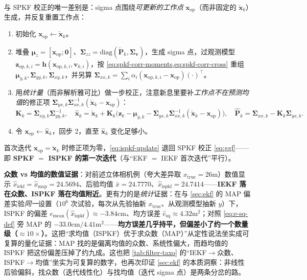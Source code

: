 \begin{algo}\label{algo:ispkf}
与 SPKF 校正的唯一差别是：sigma 点围绕\emph{可更新的工作点} $\mathbf{x}_{\text{op}}$（而非固定的 $\check{\mathbf{x}}_k$）生成，并反复重置工作点\cite{barfoot2024state}：
\begin{enumerate}
  \item 初始化 $\mathbf{x}_{\text{op}}\leftarrow\check{\mathbf{x}}_k$。
  \item 堆叠 $\boldsymbol{\mu}_z=[\mathbf{x}_{\text{op}};\mathbf{0}]$、$\boldsymbol{\Sigma}_{zz}=\mathrm{diag}(\check{\mathbf{P}}_k,\boldsymbol{\Sigma}_{\mathbf{v}})$，生成 sigma 点，过观测模型 $\mathbf{z}_{\text{op},k,i}=\mathbf{h}(\mathbf{x}_{\text{op},k,i},\mathbf{v}_{k,i})$，按 \cref{eq:spkf-corr-moments,eq:spkf-corr-cross} 重组 $\boldsymbol{\mu}_{y,k},\boldsymbol{\Sigma}_{yy,k},\boldsymbol{\Sigma}_{xy,k}$，并另算 $\boldsymbol{\Sigma}_{xx,k}=\sum_i\alpha_i(\mathbf{x}_{\text{op},k,i}-\mathbf{x}_{\text{op}})(\cdot)^\top$。
  \item 用\emph{统计量}（而非解析雅可比）做一步校正，注意新息里要补\emph{工作点不在预测均值}的修正项 $\boldsymbol{\Sigma}_{yx,k}\boldsymbol{\Sigma}_{xx,k}^{-1}(\check{\mathbf{x}}_k-\mathbf{x}_{\text{op}})$：
  \begin{equation}
    \mathbf{K}_k=\boldsymbol{\Sigma}_{xy,k}\boldsymbol{\Sigma}_{yy,k}^{-1},\quad
    \hat{\mathbf{x}}_k=\check{\mathbf{x}}_k+\mathbf{K}_k\big(\mathbf{z}_k-\boldsymbol{\mu}_{y,k}-\boldsymbol{\Sigma}_{yx,k}\boldsymbol{\Sigma}_{xx,k}^{-1}(\check{\mathbf{x}}_k-\mathbf{x}_{\text{op}})\big),\quad
    \hat{\mathbf{P}}_k=\boldsymbol{\Sigma}_{xx,k}-\mathbf{K}_k\boldsymbol{\Sigma}_{yx,k}.
    \label{eq:ispkf-update}
  \end{equation}
  \item 令 $\mathbf{x}_{\text{op}}\leftarrow\hat{\mathbf{x}}_k$，回步 2，直至 $\hat{\mathbf{x}}_k$ 变化足够小。
\end{enumerate}
首次迭代 $\mathbf{x}_{\text{op}}=\check{\mathbf{x}}_k$ 时修正项为零，\cref{eq:ispkf-update} 退回 SPKF 校正 \cref{eq:ggf}——即 \textbf{SPKF $=$ ISPKF 的第一次迭代}（与“EKF $=$ IEKF 首次迭代”平行）。
\end{algo}

\noindent\textbf{众数 vs 均值的数值证据}：对前述立体相机例（夸大差异取 $x_{\text{true}}=26$m）数值显示 $\hat{x}_{\text{iekf}}=\hat{x}_{\text{map}}=24.5694$、后验均值 $\bar{x}=24.7770$、$\hat{x}_{\text{ispkf}}=24.7414$——\textbf{IEKF 落在众数、ISPKF 落在均值附近}\cite{barfoot2024state}。更有力的是\emph{统计}证据：在与 \cref{sec:ekf} 的 MAP 偏差实验\emph{同一}设置（$10^6$ 次试验，每次从先验抽新 $x_{\text{true}}$、从观测模型抽新 $y$）下，ISPKF 的偏差 $\hat{e}_{\text{mean}}(\hat{x}_{\text{ispkf}})\approx-3.84$cm、均方误差 $\hat{e}_{\text{sq}}\approx4.32$m$^2$\cite{barfoot2024state}；对照 \cref{eq:e-sq-def} 旁 MAP 的 $-33.0$cm$/4.41$m$^2$——\textbf{均方误差几乎持平，但偏差小了约一个数量级（$\approx 10\times$）}。这把“求均值（ISPKF）优于求众数（MAP）”从定性说法坐实成可复算的量化证据：MAP 找的是偏离均值的众数、系统性偏大，而趋均值的 ISPKF 把这份偏差压掉了约九成。这也把 \cref{tab:filter-taxo} 的“IEKF$\to$众数、ISPKF$\to$均值”坐实为可复算的数字，也再次印证 \cref{sec:ekf} 的本质洞察：非线性后验偏斜，找众数（迭代线性化）与找均值（迭代 sigma 点）是两条分岔的路。

